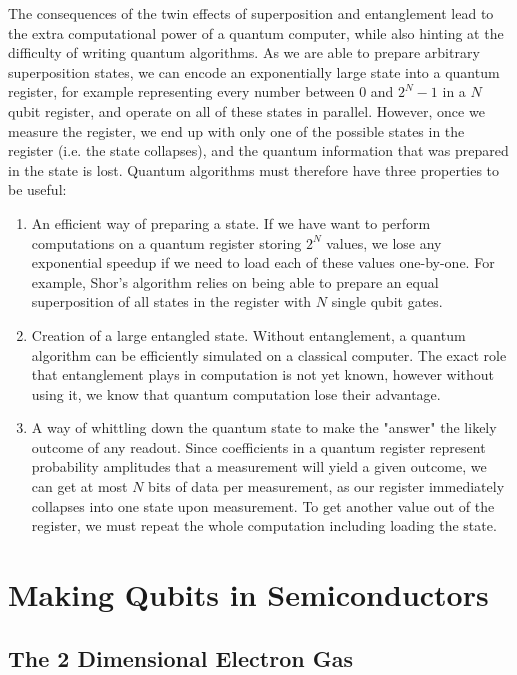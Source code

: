 The consequences of the twin effects of superposition and entanglement lead to the extra computational
power of a quantum computer, while also hinting at the difficulty of writing quantum algorithms. As we
are able to prepare arbitrary superposition states, we can encode an exponentially large
state into a quantum register, for example representing every number between 0 and $2^N-1$ in a $N$ qubit
register, and operate on all of these states in parallel. However, once we measure the register, we end up 
with only one of the possible states in the register (i.e. the state collapses), and the quantum information
that was prepared in the state is lost. Quantum algorithms must therefore have three properties to be useful:
\begin{enumerate}
  \item An efficient way of preparing a state. If we have want to perform computations on a quantum register storing
        $2^N$ values, we lose any exponential speedup if we need to load each of these values one-by-one. For example, Shor's 
        algorithm relies on being able to prepare an equal superposition of all states in the register with $N$
        single qubit gates\cite{PhysRevA.54.1034}.
  \item Creation of a large entangled state. Without entanglement, a quantum algorithm can be efficiently simulated
        on a classical computer. The exact role that entanglement plays in computation is not yet known, however without 
        using it, we know that quantum computation lose their advantage\cite{doi:10.1098/rspa.2002.1097}.
  \item A way of whittling down the quantum state to make the "answer" the likely outcome of any readout. Since
        coefficients in a quantum register represent probability amplitudes that a measurement will yield a given
        outcome, we can get at most $N$ bits of data per measurement\cite{651037}, as our register immediately collapses
        into one state upon measurement. To get another value out of the register, we must repeat the whole computation
        including loading the state.
\end{enumerate}



\section{Making Qubits in Semiconductors}
\label{sec:qcinsm}
  \subsection{The 2 Dimensional Electron Gas}
